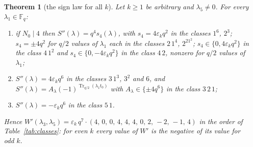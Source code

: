 \documentclass[12pt,a4paper]{amsart}
\newtheorem{theorem}{Theorem}[section]
\theoremstyle{definition}
\newcommand{\F}{\mathbb{F}}
\newcommand{\Tr}{\operatorname{Tr}}
\newcommand{\eps}{\varepsilon}
\newcommand{\Spp}{S''}
\begin{document}
\begin{theorem}[the sign law for all $k$]\label{thm:allk}
Let $k\ge1$ be arbitrary and $\lambda_5\ne0$. For every $\lambda_1\in\F_q$:
\begin{enumerate}[label=\textup{(\roman*)},leftmargin=2em]
\item if $N_0\mid4$ then $\Spp(\lambda)=q^4s_4(\lambda)$, with $s_4=4\eps_kq^2$ in the classes $1^6$, $2^3$; $s_4=\pm4q^2$ for $q/2$ values of $\lambda_1$ each in the classes $2\,1^4$, $2^21^2$; $s_4\in\{0,4\eps_kq^2\}$ in the class $4\,1^2$ and $s_4\in\{0,-4\eps_kq^2\}$ in the class $4\,2$, nonzero for $q/2$ values of $\lambda_1$;
\item $\Spp(\lambda)=4\eps_kq^6$ in the classes $3\,1^3$, $3^2$ and $6$, and $\Spp(\lambda)=A_\lambda(-1)^{\Tr_{q/2}(\lambda_1t_0)}$ with $A_\lambda\in\{\pm4q^6\}$ in the class $3\,2\,1$;
\item $\Spp(\lambda)=-\eps_kq^6$ in the class $5\,1$.
\end{enumerate}
Hence $W'(\lambda_3,\lambda_5)=\eps_k\,q^7\cdot(4,\,0,\,0,\,4,\,4,\,4,\,0,\,2,\,-2,\,-1,\,4)$ in the order of Table~\ref{tab:classes}: for even $k$ every value of $W'$ is the negative of its value for odd $k$.
\end{theorem}
\end{document}
